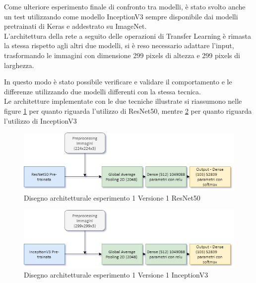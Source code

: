 Come ulteriore esperimento finale di confronto tra modelli, è stato svolto anche un test utilizzando come modello InceptionV3 \cite{inceptionv3} sempre disponibile dai modelli pretrainati di Keras e addestrato su ImageNet. \\

L'architettura della rete a seguito delle operazioni di Transfer Learning è rimasta la stessa rispetto agli altri due modelli, si è reso necessario adattare l'input, trasformando le immagini con dimensione 299 pixels di altezza e 299 pixels di larghezza.  \bigskip

In questo modo è stato possibile verificare e validare il comportamento e le differenze utilizzando due modelli differenti con la stessa tecnica. \\

Le architetture implementate con le due tecniche illustrate si riassumono nelle figure \ref{fig:architettura-esperimento1_V1} per quanto riguarda l'utilizzo di ResNet50, mentre \ref{fig:architettura-esperimento1_V2} per quanto riguarda l'utilizzo di InceptionV3

\begin{figure}
    \centering
    \includegraphics[width=1\textwidth]{./resources/AdvanceMachineLearningSchema-Esperimento1_V1.png}
    \caption{Disegno architetturale esperimento 1 Versione 1 ResNet50} 
    \label{fig:architettura-esperimento1_V1}
\end{figure}


\begin{figure}
    \centering
    \includegraphics[width=1\textwidth]{./resources/AdvanceMachineLearningSchema-Esperimento1_V2.png}
    \caption{Disegno architetturale esperimento 1 Versione 1 InceptionV3} 
    \label{fig:architettura-esperimento1_V2}
\end{figure}

